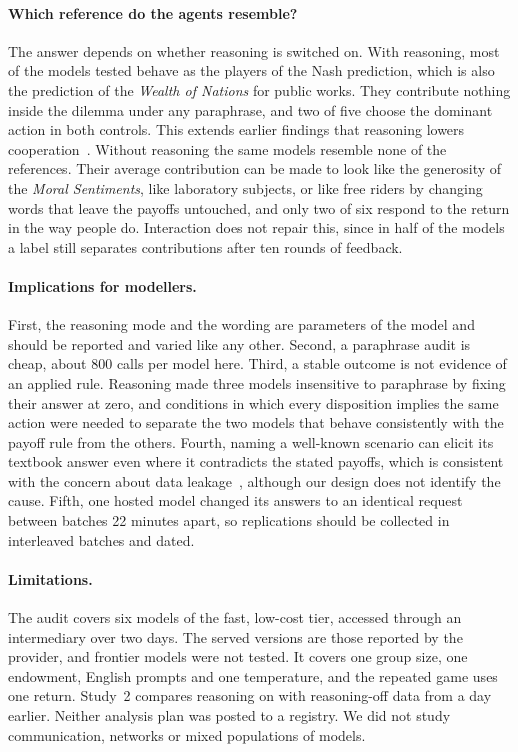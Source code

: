 \documentclass[runningheads]{llncs}
\begin{document}
\paragraph{Which reference do the agents resemble?} The answer depends on whether reasoning is switched on. With reasoning, most of the models tested behave as the players of the Nash prediction, which is also the prediction of the \emph{Wealth of Nations} for public works. They contribute nothing inside the dilemma under any paraphrase, and two of five choose the dominant action in both controls. This extends earlier findings that reasoning lowers cooperation~\cite{li2025spontaneous,kitadai2025reasoning}. Without reasoning the same models resemble none of the references. Their average contribution can be made to look like the generosity of the \emph{Moral Sentiments}, like laboratory subjects, or like free riders by changing words that leave the payoffs untouched, and only two of six respond to the return in the way people do. Interaction does not repair this, since in half of the models a label still separates contributions after ten rounds of feedback.

\paragraph{Implications for modellers.} First, the reasoning mode and the wording are parameters of the model and should be reported and varied like any other. Second, a paraphrase audit is cheap, about 800 calls per model here. Third, a stable outcome is not evidence of an applied rule. Reasoning made three models insensitive to paraphrase by fixing their answer at zero, and conditions in which every disposition implies the same action were needed to separate the two models that behave consistently with the payoff rule from the others. Fourth, naming a well-known scenario can elicit its textbook answer even where it contradicts the stated payoffs, which is consistent with the concern about data leakage~\cite{larooij2026validation}, although our design does not identify the cause. Fifth, one hosted model changed its answers to an identical request between batches 22 minutes apart, so replications should be collected in interleaved batches and dated.

\paragraph{Limitations.} The audit covers six models of the fast, low-cost tier, accessed through an intermediary over two days. The served versions are those reported by the provider, and frontier models were not tested. It covers one group size, one endowment, English prompts and one temperature, and the repeated game uses one return. Study~2 compares reasoning on with reasoning-off data from a day earlier. Neither analysis plan was posted to a registry. We did not study communication, networks or mixed populations of models.
\end{document}
